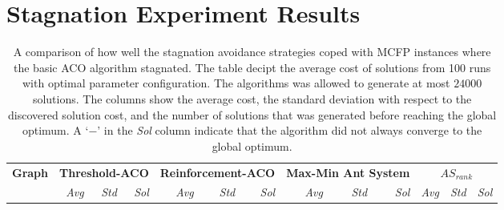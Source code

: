
\chapter{Stagnation Experiment Results}\label{appendix:stagnation_tables}

\begin{sidewaystable}[p]
   \tiny
   \caption[Stagnation avoidance efficiency]{A comparison of how well the stagnation avoidance strategies coped with MCFP instances where the basic ACO algorithm stagnated. The table decipt the average cost of solutions from 100 runs with optimal parameter configuration. The algorithms was allowed to generate at most $24000$ solutions. The columns show the average cost, the standard deviation with respect to the discovered solution cost, and the number of solutions that was generated before reaching the global optimum. A `$-$' in the \emph{Sol} column indicate that the algorithm did not always converge to the global optimum.}
   \centering
   
   \begin{tabular}{lrrrrrrrrrrrr}
   \toprule
   
  \textbf{Graph} & \multicolumn{3}{c}{\textbf{Threshold\@{-}ACO}} & \multicolumn{3}{c}{\textbf{Reinforcement\@{-}ACO}} & \multicolumn{3}{c}{\textbf{Max\@{-}Min Ant System}} & \multicolumn{3}{c}{\textbf{$AS_{rank}$}}\\
  \cmidrule(lr){2-4}
  \cmidrule(lr){5-7}
  \cmidrule(lr){8-10}
  \cmidrule(lr){11-13}
  & \emph{Avg} & \emph{Std} & \emph{Sol} & \emph{Avg} & \emph{Std} & \emph{Sol} & \emph{Avg} & \emph{Std} & \emph{Sol} & \emph{Avg} & \emph{Std} & \emph{Sol}\\
  \cmidrule(lr){2-2}
  \cmidrule(lr){3-3}
  \cmidrule(lr){4-4}
  \cmidrule(lr){5-5}
  \cmidrule(lr){6-6}
  \cmidrule(lr){7-7}
  \cmidrule(lr){8-8}
  \cmidrule(lr){9-9}
  \cmidrule(lr){10-10}
  \cmidrule(lr){11-11}
  \cmidrule(lr){12-12}
  \cmidrule(lr){13-13}
  

\end{tabular}
\end{sidewaystable}
